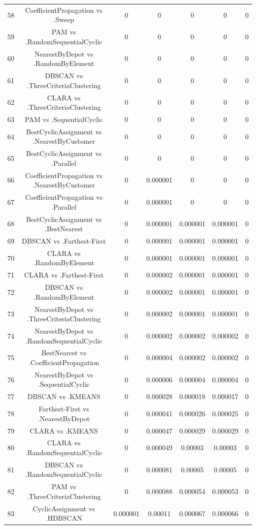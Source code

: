 \documentclass[a4paper,10pt]{article}
\begin{document}
\begin{landscape}
\begin{table}[!htp]
\begin{tabular}{ccccccc}
58&CoefficientPropagation vs .Sweep&0&0&0&0&0\\
59&PAM vs .RandomSequentialCyclic&0&0&0&0&0\\
60&NearestByDepot vs .RandomByElement&0&0&0&0&0\\
61&DBSCAN vs .ThreeCriteriaClustering&0&0&0&0&0\\
62&CLARA vs .ThreeCriteriaClustering&0&0&0&0&0\\
63&PAM vs .SequentialCyclic&0&0&0&0&0\\
64&BestCyclicAssignment vs .NearestByCustomer&0&0&0&0&0\\
65&BestCyclicAssignment vs .Parallel&0&0&0&0&0\\
66&CoefficientPropagation vs .NearestByCustomer&0&0.000001&0&0&0\\
67&CoefficientPropagation vs .Parallel&0&0.000001&0&0&0\\
68&BestCyclicAssignment vs .BestNearest&0&0.000001&0.000001&0.000001&0\\
69&DBSCAN vs .Farthest-First&0&0.000001&0.000001&0.000001&0\\
70&CLARA vs .RandomByElement&0&0.000001&0.000001&0.000001&0\\
71&CLARA vs .Farthest-First&0&0.000002&0.000001&0.000001&0\\
72&DBSCAN vs .RandomByElement&0&0.000002&0.000001&0.000001&0\\
73&NearestByDepot vs .ThreeCriteriaClustering&0&0.000002&0.000001&0.000001&0\\
74&NearestByDepot vs .RandomSequentialCyclic&0&0.000002&0.000002&0.000002&0\\
75&BestNearest vs .CoefficientPropagation&0&0.000004&0.000002&0.000002&0\\
76&NearestByDepot vs .SequentialCyclic&0&0.000006&0.000004&0.000004&0\\
77&DBSCAN vs .KMEANS&0&0.000028&0.000018&0.000017&0\\
78&Farthest-First vs .NearestByDepot&0&0.000041&0.000026&0.000025&0\\
79&CLARA vs .KMEANS&0&0.000047&0.000029&0.000029&0\\
80&CLARA vs .RandomSequentialCyclic&0&0.000049&0.00003&0.00003&0\\
81&DBSCAN vs .RandomSequentialCyclic&0&0.000081&0.00005&0.00005&0\\
82&PAM vs .ThreeCriteriaClustering&0&0.000088&0.000054&0.000053&0\\
83&CyclicAssignment vs .HDBSCAN&0.000001&0.00011&0.000067&0.000066&0\\

\end{tabular}
\end{table}
\end{landscape}
\end{document}
